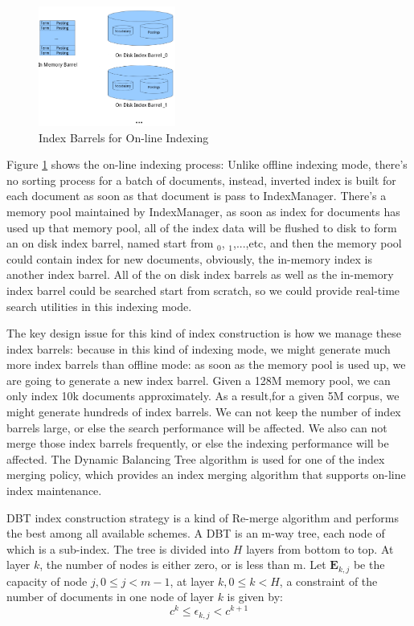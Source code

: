 \begin{figure}[h!]
\centerline{\includegraphics[width=0.4\textwidth]{Figures/barrel1.png}}
\caption{Index Barrels for On-line Indexing}\label{fig:indexcon-barrel1}
\end{figure}

Figure \ref{fig:indexcon-barrel1} shows the on-line indexing process: Unlike offline indexing mode, there's no sorting process for a batch of documents, instead, inverted index is built for each document as soon as that 
document is pass to IndexManager. There's a memory pool maintained by IndexManager, as soon as index for documents has used up that memory pool, all of the index data will be flushed to disk to form an on disk
index barrel, named start from $_0$, $_1$,...,etc, and then the memory pool could contain index for new documents, obviously, the in-memory index is another index barrel.  All of the on disk index barrels as well as 
the in-memory index barrel could be searched start from scratch, so we could provide real-time search utilities in this indexing mode.

The key design issue for this kind of index construction is how we manage these index barrels: because in this kind of indexing mode, we might generate much more index barrels than offline mode: as soon as the memory
pool is used up, we are going to generate a new index barrel. Given a 128M memory pool, we can only index 10k documents approximately. As a result,for a given 5M corpus, we might generate hundreds of index barrels. 
We can not keep the number of index barrels large, or else the search performance will be affected. We also can not merge those index barrels frequently, or else the indexing performance will be affected. The Dynamic 
Balancing Tree algorithm \cite{guo2007eli} is used for one of the index merging policy, which provides an index merging algorithm that supports on-line index maintenance. 
\par
DBT\cite{guo2007eli} index construction strategy is a kind of Re-merge algorithm and performs the best among all available schemes.  A DBT is an m-way tree, each node of which is a sub-index. The tree is divided into $H$ layers from bottom to top. At layer $k$, the number of nodes is either zero, or is less than m. Let $\mathbf{E}_{k,j}$ be the capacity of node $j, 0\leq j<m-1$, at layer $k, 0\leq k<H$, a constraint of the number of documents in one node of layer $k$ is given by:
\begin{equation}
c^{k}\leq \epsilon_{k,j}<c^{k+1}
\end{equation}

